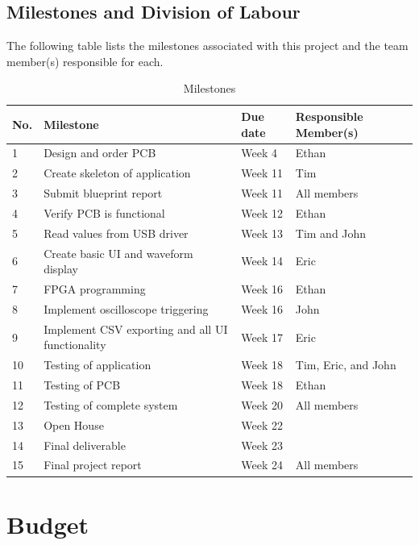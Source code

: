 \documentclass[letterpaper,12pt]{article}
\begin{document}
\subsection{Milestones and Division of Labour}
The following table lists the milestones associated with this project and the
team member(s) responsible for each.
\begin{table}[h!]
    \caption{Milestones}
    \begin{tabularx}{\textwidth}{l|l|l|l}
        No. & Milestone & Due date & Responsible Member(s) \\
        \hline
        1 & Design and order PCB & Week 4 & Ethan \\
        2 & Create skeleton of application & Week 11 & Tim \\
        3 & Submit blueprint report & Week 11 & All members \\
        4 & Verify PCB is functional & Week 12 & Ethan \\
        5 & Read values from USB driver & Week 13 & Tim and John \\
        6 & Create basic UI and waveform display & Week 14 & Eric \\
        7 & FPGA programming & Week 16 & Ethan \\
        8 & Implement oscilloscope triggering & Week 16 & John \\
        9 & Implement CSV exporting and all UI functionality & Week 17 & Eric \\
        10 & Testing of application & Week 18 & Tim, Eric, and John \\
        11 & Testing of PCB & Week 18 & Ethan \\
        12 & Testing of complete system & Week 20 & All members \\
        13 & Open House & Week 22 & \\
        14 & Final deliverable & Week 23 & \\
        15 & Final project report & Week 24 & All members
    \end{tabularx} 
\label{hw:milestones-table}
\end{table}
\section{Budget} %
\end{document}
